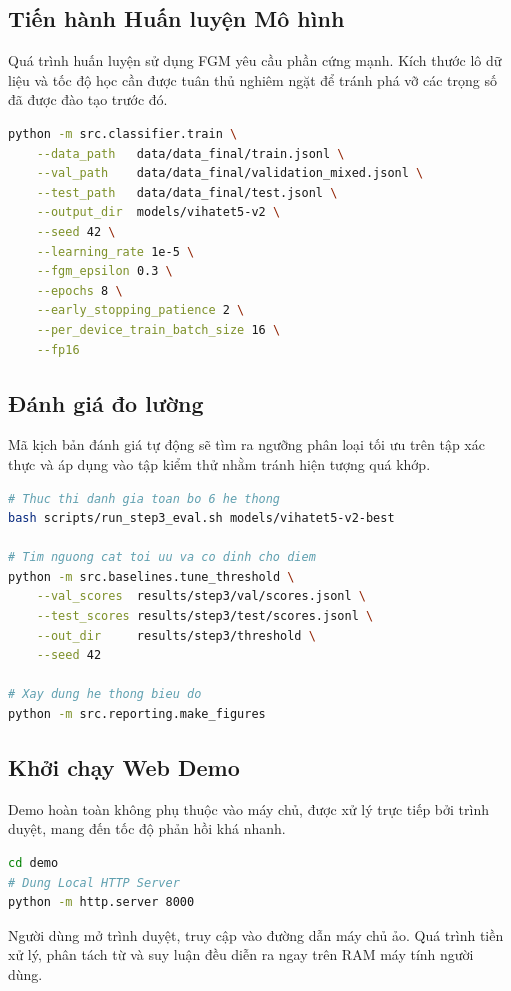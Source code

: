 \documentclass[12pt,a4paper]{article}
\begin{document}
\subsection{Tiến hành Huấn luyện Mô hình}
Quá trình huấn luyện sử dụng FGM yêu cầu phần cứng mạnh. Kích thước lô dữ liệu và tốc độ học cần được tuân thủ nghiêm ngặt để tránh phá vỡ các trọng số đã được đào tạo trước đó.
\begin{lstlisting}[language=bash]
python -m src.classifier.train \
    --data_path   data/data_final/train.jsonl \
    --val_path    data/data_final/validation_mixed.jsonl \
    --test_path   data/data_final/test.jsonl \
    --output_dir  models/vihatet5-v2 \
    --seed 42 \
    --learning_rate 1e-5 \
    --fgm_epsilon 0.3 \
    --epochs 8 \
    --early_stopping_patience 2 \
    --per_device_train_batch_size 16 \
    --fp16
\end{lstlisting}

\subsection{Đánh giá đo lường}
Mã kịch bản đánh giá tự động sẽ tìm ra ngưỡng phân loại tối ưu trên tập xác thực và áp dụng vào tập kiểm thử nhằm tránh hiện tượng quá khớp.
\begin{lstlisting}[language=bash]
# Thuc thi danh gia toan bo 6 he thong
bash scripts/run_step3_eval.sh models/vihatet5-v2-best

# Tim nguong cat toi uu va co dinh cho diem
python -m src.baselines.tune_threshold \
    --val_scores  results/step3/val/scores.jsonl \
    --test_scores results/step3/test/scores.jsonl \
    --out_dir     results/step3/threshold \
    --seed 42

# Xay dung he thong bieu do
python -m src.reporting.make_figures
\end{lstlisting}

\subsection{Khởi chạy Web Demo}
Demo hoàn toàn không phụ thuộc vào máy chủ, được xử lý trực tiếp bởi trình duyệt, mang đến tốc độ phản hồi khá nhanh.
\begin{lstlisting}[language=bash]
cd demo
# Dung Local HTTP Server
python -m http.server 8000
\end{lstlisting}
Người dùng mở trình duyệt, truy cập vào đường dẫn máy chủ ảo. Quá trình tiền xử lý, phân tách từ và suy luận đều diễn ra ngay trên RAM máy tính người dùng.
\end{document}
